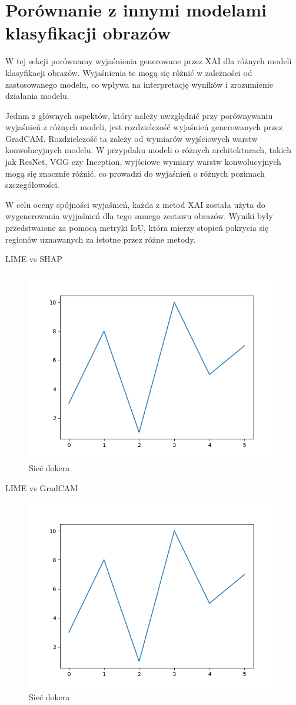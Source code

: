 \section*{Porównanie z innymi modelami klasyfikacji obrazów}
W tej sekcji porównamy wyjaśnienia generowane przez XAI dla różnych modeli klasyfikacji obrazów.
Wyjaśnienia te mogą się różnić w zależności od zastosowanego modelu, co wpływa na interpretację wyników i zrozumienie działania modelu.

Jednm z głównych aspektów, który należy uwzględnić przy porównywaniu wyjaśnień z różnych modeli, jest rozdzielczość wyjaśnień generowanych przez GradCAM.
Rozdzielczość ta zależy od wymiarów wyjściowych warstw konwolucyjnych modelu.
W przypdaku modeli o różnych architekturach, takich jak ResNet, VGG czy Inception, wyjściowe wymiary warstw konwolucyjnych mogą się znacznie różnić, co prowadzi do wyjaśnień o różnych pozimach szczegółowości.

W celu oceny spójności wyjaśnień, każda z metod XAI została użyta do wygenerowania wyjjaśnień dla tego samego zestawu obrazów.
Wyniki były przedstwaione za pomocą metryki IoU, która mierzy stopień pokrycia się regionów uznawanych za istotne przez różne metody.

LIME vs SHAP
\begin{figure}
	\centering\includegraphics[width=.6\textwidth]{images/example}
	\caption{Sieć dokera \cite{docker_compose_reference}}  \label{rys:network}
\end{figure}

LIME vs GradCAM
\begin{figure}
	\centering\includegraphics[width=.6\textwidth]{images/example}
	\caption{Sieć dokera \cite{docker_compose_reference}}  \label{rys:network}
\end{figure}


